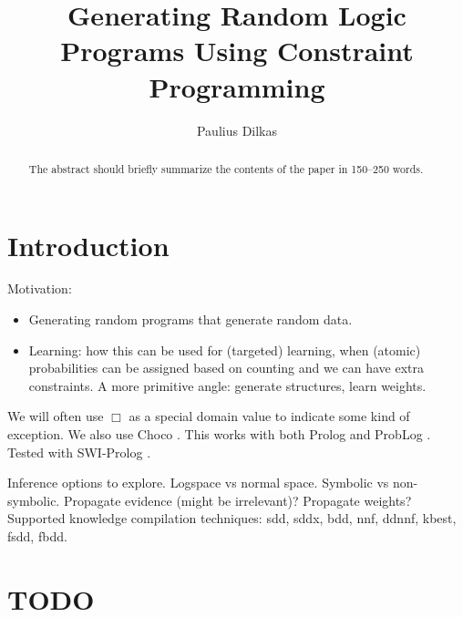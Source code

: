 \documentclass[runningheads]{llncs}
\begin{document}
\title{Generating Random Logic Programs Using Constraint Programming}
\author{Paulius Dilkas}

\maketitle

\begin{abstract}
The abstract should briefly summarize the contents of the paper in
150--250 words.

\end{abstract}

\section{Introduction}

Motivation:
\begin{itemize}
\item Generating random programs that generate random data.
\item Learning: how this can be used for (targeted) learning, when (atomic)
  probabilities can be assigned based on counting and we can have extra
  constraints. A more primitive angle: generate structures, learn weights.
\end{itemize}

We will often use $\Box$ as a special domain value to indicate some kind of
exception. We also use Choco \cite{choco}. This works with both Prolog
\cite{DBLP:books/daglib/0041598} and ProbLog \cite{DBLP:conf/ijcai/RaedtKT07}.
Tested with SWI-Prolog \cite{DBLP:journals/tplp/WielemakerSTL12}.

Inference options to explore. Logspace vs normal space. Symbolic vs
non-symbolic. Propagate evidence (might be irrelevant)? Propagate weights?
Supported knowledge compilation techniques: sdd, sddx, bdd, nnf, ddnnf, kbest,
fsdd, fbdd.

\section{TODO}
\end{document}
